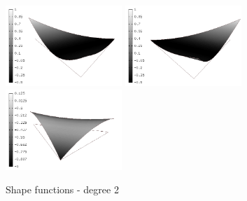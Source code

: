 \begin{figure}[H]
\begin{center}
\includegraphics[width=4.4cm]{minor_examples/BasisFunctions020}
\includegraphics[width=4.4cm]{minor_examples/BasisFunctions021}
\includegraphics[width=4.4cm]{minor_examples/BasisFunctions024}
\end{center}
\caption{Shape functions - degree 2}
\vspace{-7mm}
\label{bubbleshape2t}
\end{figure}

